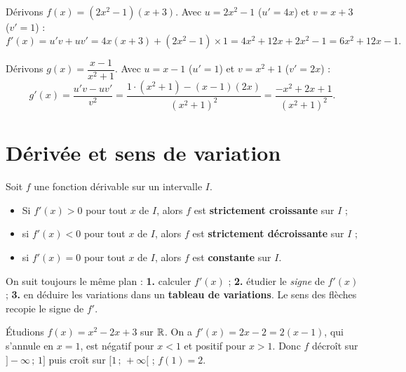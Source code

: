 \begin{exemple}
Dérivons $f(x)=(2x^2-1)(x+3)$. Avec $u=2x^2-1$ ($u'=4x$) et $v=x+3$ ($v'=1$) :
\[ f'(x)=u'v+uv'=4x(x+3)+(2x^2-1)\times 1=4x^2+12x+2x^2-1=6x^2+12x-1. \]
\end{exemple}

\begin{exemple}
Dérivons $g(x)=\dfrac{x-1}{x^2+1}$. Avec $u=x-1$ ($u'=1$) et $v=x^2+1$ ($v'=2x$) :
\[ g'(x)=\frac{u'v-uv'}{v^2}=\frac{1\cdot(x^2+1)-(x-1)(2x)}{(x^2+1)^2}
 =\frac{-x^2+2x+1}{(x^2+1)^2}. \]
\end{exemple}

\section{Dérivée et sens de variation}

\begin{theoreme}
Soit $f$ une fonction dérivable sur un intervalle $I$.
\begin{itemize}
  \item Si $f'(x)>0$ pour tout $x$ de $I$, alors $f$ est \textbf{strictement croissante} sur $I$ ;
  \item si $f'(x)<0$ pour tout $x$ de $I$, alors $f$ est \textbf{strictement décroissante} sur $I$ ;
  \item si $f'(x)=0$ pour tout $x$ de $I$, alors $f$ est \textbf{constante} sur $I$.
\end{itemize}
\end{theoreme}

\begin{aretenir}
On suit toujours le même plan : \textbf{1.} calculer $f'(x)$ ; \textbf{2.} étudier le
\emph{signe} de $f'(x)$ ; \textbf{3.} en déduire les variations dans un
\textbf{tableau de variations}. Le sens des flèches recopie le signe de $f'$.
\end{aretenir}

\begin{exemple}
Étudions $f(x)=x^2-2x+3$ sur $\mathbb{R}$. On a $f'(x)=2x-2=2(x-1)$, qui s'annule en $x=1$,
est négatif pour $x<1$ et positif pour $x>1$. Donc $f$ décroît sur $]-\infty\,;\,1]$
puis croît sur $[1\,;\,+\infty[$ ; $f(1)=2$.
\end{exemple}

